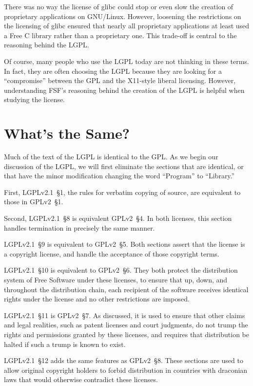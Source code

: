 There was no way the license of glibc could stop or even slow the creation
of proprietary applications on GNU/Linux. However, loosening the
restrictions on the licensing of glibc ensured that nearly all proprietary
applications at least used a Free C library rather than a proprietary one.
This trade-off is central to the reasoning behind the LGPL\@.

Of course, many people who use the LGPL today are not thinking in these
terms. In fact, they are often choosing the LGPL because they are looking
for a ``compromise'' between the GPL and the X11-style liberal licensing.
However, understanding FSF's reasoning behind the creation of the LGPL is
helpful when studying the license.


\section{What's the Same?}

Much of the text of the LGPL is identical to the GPL\@. As we begin our
discussion of the LGPL, we will first eliminate the sections that are
identical, or that have the minor modification changing the word
``Program'' to ``Library.''

First, LGPLv2.1~\S1, the rules for verbatim copying of source, are
equivalent to those in GPLv2~\S1.

Second, LGPLv2.1~\S8 is equivalent GPLv2~\S4\@. In both licenses, this
section handles termination in precisely the same manner.

LGPLv2.1~\S9 is equivalent to GPLv2~\S5\@. Both sections assert that
the license is a copyright license, and handle the acceptance of those
copyright terms.

LGPLv2.1~\S10 is equivalent to GPLv2~\S6. They both protect the
distribution system of Free Software under these licenses, to ensure that
up, down, and throughout the distribution chain, each recipient of the
software receives identical rights under the license and no other
restrictions are imposed.

LGPLv2.1~\S11 is GPLv2~\S7. As discussed, it is used to ensure that
other claims and legal realities, such as patent licenses and court
judgments, do not trump the rights and permissions granted by these
licenses, and requires that distribution be halted if such a trump is
known to exist.

LGPLv2.1~\S12 adds the same features as GPLv2~\S8. These sections are
used to allow original copyright holders to forbid distribution in
countries with draconian laws that would otherwise contradict these
licenses.

